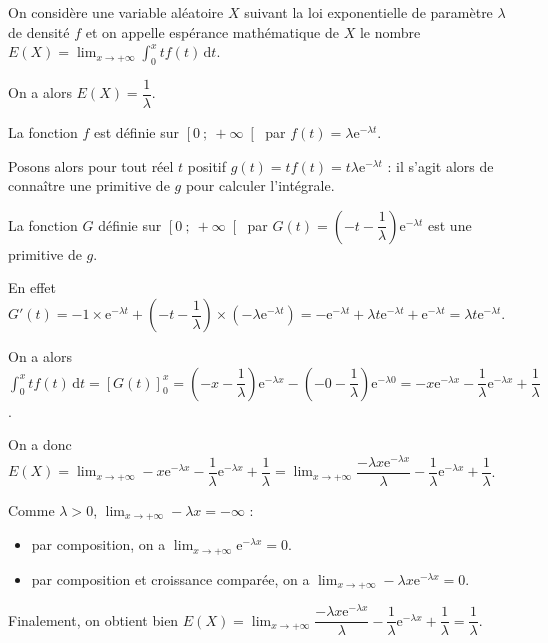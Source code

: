 \documentclass{cornouaille}
\begin{document}
\begin{propriete}
On considère une variable aléatoire $X$ suivant la loi exponentielle de paramètre $\lambda$ de densité $f$ et on appelle espérance mathématique de $X$ le nombre $E(X)=\displaystyle \lim_{x \rightarrow +\infty} \int_{0}^{x} tf(t) \, \textrm{d}t$.

On a alors $E(X)=\dfrac{1}{\lambda}$.
\end{propriete}



\begin{preuve}
La fonction $f$ est définie sur $\left[0\ ;\ +\infty \right[$ par $f(t)=\lambda\textrm{e}^{-\lambda t}$.

Posons alors pour tout réel $t$ positif $g(t)=tf(t)=t\lambda\textrm{e}^{-\lambda t}$ : il s'agit alors de connaître une primitive de $g$ pour calculer l'intégrale.

La fonction $G$ définie sur $\left[0\ ;\ +\infty \right[$  par $G(t)=\left(-t-\dfrac{1}{\lambda}\right)\textrm{e}^{-\lambda t}$ est une primitive de $g$.

En effet $G'(t)=-1\times \textrm{e}^{-\lambda t} + \left(-t-\dfrac{1}{\lambda}\right)\times \left(-\lambda \textrm{e}^{-\lambda t}\right)=-\textrm{e}^{-\lambda t} + \lambda t \textrm{e}^{-\lambda t} + \textrm{e}^{-\lambda t} = \lambda t \textrm{e}^{-\lambda t}$.

On a alors ${\displaystyle\int_{0}^{x} tf(t) \, \textrm{d}t = \left[G(t)\right]_0^x=\left(-x-\dfrac{1}{\lambda}\right)\textrm{e}^{-\lambda x}-\left(-0-\dfrac{1}{\lambda}\right)\textrm{e}^{-\lambda 0}=-x\textrm{e}^{-\lambda x}-\dfrac{1}{\lambda}\textrm{e}^{-\lambda x}+\dfrac{1}{\lambda}}$.

On a donc $E(X) = \displaystyle \lim_{x \rightarrow +\infty} -x\textrm{e}^{-\lambda x}-\dfrac{1}{\lambda}\textrm{e}^{-\lambda x}+\dfrac{1}{\lambda}=\displaystyle \lim_{x \rightarrow +\infty} \dfrac{-\lambda x\textrm{e}^{-\lambda x}}{\lambda}-\dfrac{1}{\lambda}\textrm{e}^{-\lambda x}+\dfrac{1}{\lambda}$.

Comme $\lambda>0$, $\displaystyle \lim_{x \rightarrow +\infty} -\lambda x=-\infty$  :

\begin{itemize}
\item par composition, on a $\displaystyle \lim_{x \rightarrow +\infty} \textrm{e}^{-\lambda x}=0$.
\item par composition et croissance comparée, on a $\displaystyle \lim_{x \rightarrow +\infty} -\lambda x \textrm{e}^{-\lambda x}=0$.
\end{itemize}

Finalement, on obtient bien $E(X) = \displaystyle \lim_{x \rightarrow +\infty} \dfrac{-\lambda x\textrm{e}^{-\lambda x}}{\lambda}-\dfrac{1}{\lambda}\textrm{e}^{-\lambda x}+\dfrac{1}{\lambda}=\dfrac{1}{\lambda}$.

\end{preuve}
\end{document}

